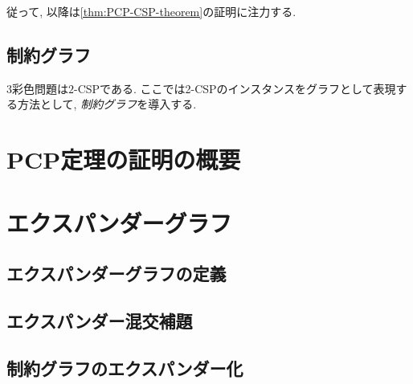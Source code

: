 従って, 以降は\cref{thm:PCP-CSP-theorem}の証明に注力する.

\subsection{制約グラフ}
3彩色問題は$2$-CSPである. ここでは2-CSPのインスタンスをグラフとして表現する方法として, \emph{制約グラフ}を導入する.


\section{PCP定理の証明の概要}

\section{エクスパンダーグラフ}
\subsection{エクスパンダーグラフの定義}
\subsection{エクスパンダー混交補題}
\subsection{制約グラフのエクスパンダー化}